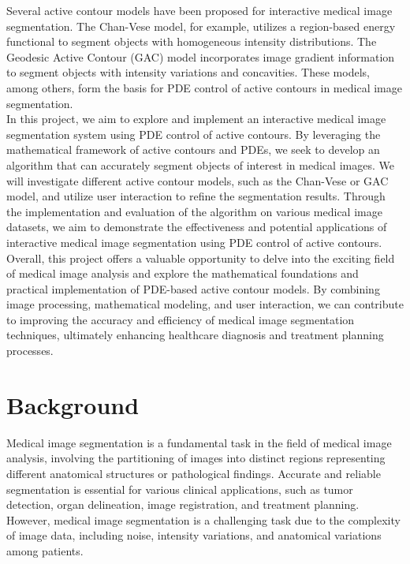 \documentclass[]{report}
\begin{document}
Several active contour models have been proposed for interactive medical image segmentation. The Chan-Vese model, for example, utilizes a region-based energy functional to segment objects with homogeneous intensity distributions. The Geodesic Active Contour (GAC) model incorporates image gradient information to segment objects with intensity variations and concavities. These models, among others, form the basis for PDE control of active contours in medical image segmentation.\\

In this project, we aim to explore and implement an interactive medical image segmentation system using PDE control of active contours. By leveraging the mathematical framework of active contours and PDEs, we seek to develop an algorithm that can accurately segment objects of interest in medical images. We will investigate different active contour models, such as the Chan-Vese or GAC model, and utilize user interaction to refine the segmentation results. Through the implementation and evaluation of the algorithm on various medical image datasets, we aim to demonstrate the effectiveness and potential applications of interactive medical image segmentation using PDE control of active contours.\\

Overall, this project offers a valuable opportunity to delve into the exciting field of medical image analysis and explore the mathematical foundations and practical implementation of PDE-based active contour models. By combining image processing, mathematical modeling, and user interaction, we can contribute to improving the accuracy and efficiency of medical image segmentation techniques, ultimately enhancing healthcare diagnosis and treatment planning processes.

\chapter*{Background}
Medical image segmentation is a fundamental task in the field of medical image analysis, involving the partitioning of images into distinct regions representing different anatomical structures or pathological findings. Accurate and reliable segmentation is essential for various clinical applications, such as tumor detection, organ delineation, image registration, and treatment planning. However, medical image segmentation is a challenging task due to the complexity of image data, including noise, intensity variations, and anatomical variations among patients.\\
\end{document}
